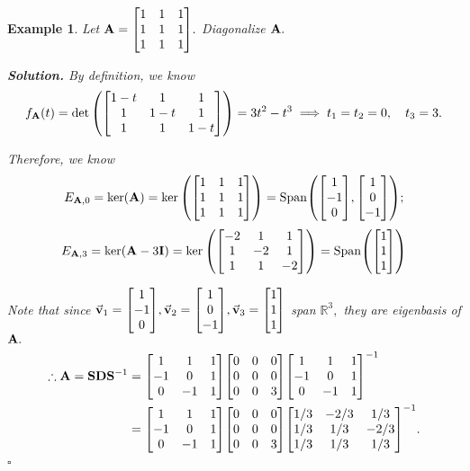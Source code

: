 \documentclass[12pt, a4paper]{article}
\newtheorem{eg}{Example}[subsection]
\newenvironment*{sol}{\par\indent\textbf{\textit{Solution. }}}{\hfill{$\square$}\par}
\def\R{{\mathbb{R}}}
\def\Span{\mathrm{Span}}
\def\vecv{\va{v}}
\def\matrixA{\vb{A}}
\def\matrixD{\vb{D}}
\def\matrixI{\vb{I}}
\def\matrixS{\vb{S}}
\begin{document}
\begin{eg}
	Let $\matrixA=\mqty[1&1&1\\1&1&1\\1&1&1].$ Diagonalize $\matrixA.$
	\begin{sol}
		By definition, we know \[f_{\matrixA}(t)=\det\qty(\mqty[1-t&1&1\\1&1-t&1\\1&1&1-t])=3t^2-t^3\implies t_1=t_2=0,\quad t_3=3.\]\par Therefore, we know \[E_{\matrixA,0}=\ker(\matrixA)=\ker\qty(\mqty[1&1&1\\1&1&1\\1&1&1])=\Span\qty(\mqty[1\\-1\\0],\mqty[1\\0\\-1]);\] \[E_{\matrixA,3}=\ker(\matrixA-3\matrixI)=\ker\qty(\mqty[-2&1&1\\1&-2&1\\1&1&-2])=\Span\qty(\mqty[1\\1\\1])\]\par Note that since $\vecv_1=\mqty[1\\-1\\0],\vecv_2=\mqty[1\\0\\-1],\vecv_3=\mqty[1\\1\\1]$ span $\R^3,$ they are eigenbasis of $\matrixA.$ \[\begin{aligned}\therefore\matrixA=\matrixS\matrixD\matrixS^{-1}&=\mqty[1&1&1\\-1&0&1\\0&-1&1]\mqty[0&0&0\\0&0&0\\0&0&3]\mqty[1&1&1\\-1&0&1\\0&-1&1]^{-1}\\&=\mqty[1&1&1\\-1&0&1\\0&-1&1]\mqty[0&0&0\\0&0&0\\0&0&3]\mqty[1/3&-2/3&1/3\\1/3&1/3&-2/3\\1/3&1/3&1/3]^{-1}.\end{aligned}\]
	\end{sol}
\end{eg}
\end{document}

